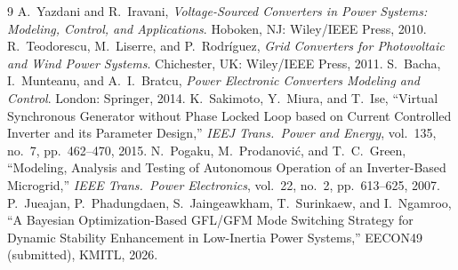 \documentclass[12pt,a4paper]{article}
\begin{document}
\begin{thebibliography}{9}
 A.~Yazdani and R.~Iravani, \emph{Voltage-Sourced Converters
in Power Systems: Modeling, Control, and Applications}. Hoboken, NJ: Wiley/IEEE
Press, 2010.
 R.~Teodorescu, M.~Liserre, and P.~Rodr\'iguez,
\emph{Grid Converters for Photovoltaic and Wind Power Systems}. Chichester, UK:
Wiley/IEEE Press, 2011.
 S.~Bacha, I.~Munteanu, and A.~I.~Bratcu, \emph{Power
Electronic Converters Modeling and Control}. London: Springer, 2014.
 K.~Sakimoto, Y.~Miura, and T.~Ise, ``Virtual Synchronous
Generator without Phase Locked Loop based on Current Controlled Inverter and its
Parameter Design,'' \emph{IEEJ Trans.\ Power and Energy}, vol.~135, no.~7,
pp.~462--470, 2015.
 N.~Pogaku, M.~Prodanovi\'c, and T.~C.~Green, ``Modeling,
Analysis and Testing of Autonomous Operation of an Inverter-Based Microgrid,''
\emph{IEEE Trans.\ Power Electronics}, vol.~22, no.~2, pp.~613--625, 2007.
 P.~Jueajan, P.~Phadungdaen, S.~Jaingeawkham, T.~Surinkaew, and
I.~Ngamroo, ``A Bayesian Optimization-Based GFL/GFM Mode Switching Strategy for
Dynamic Stability Enhancement in Low-Inertia Power Systems,'' EECON49 (submitted),
KMITL, 2026.
\end{thebibliography}
\end{document}
